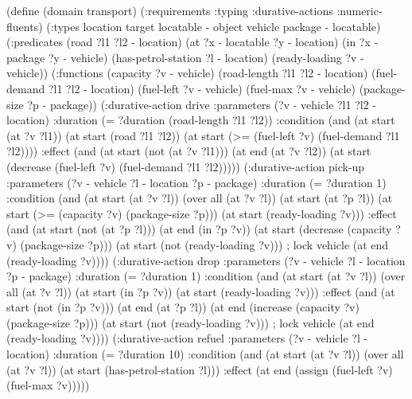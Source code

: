 \begin{pddl}
(define (domain transport) 
  (:requirements :typing :durative-actions :numeric-fluents)
  (:types
        location target locatable - object
        vehicle package - locatable)
  (:predicates (road ?l1 ?l2 - location)
     (at ?x - locatable ?y - location) (in ?x - package ?y - vehicle)
     (has-petrol-station ?l - location) (ready-loading ?v - vehicle))
  (:functions (capacity ?v - vehicle) (road-length ?l1 ?l2 - location)
     (fuel-demand ?l1 ?l2 - location) (fuel-left ?v - vehicle)
     (fuel-max ?v - vehicle) (package-size ?p - package))
  (:durative-action drive
    :parameters (?v - vehicle ?l1 ?l2 - location)
    :duration (= ?duration (road-length ?l1 ?l2))
    :condition (and (at start (at ?v ?l1))
        (at start (road ?l1 ?l2))
        (at start (>= (fuel-left ?v) (fuel-demand ?l1 ?l2))))
    :effect (and (at start (not (at ?v ?l1)))
        (at end (at ?v ?l2))
        (at start (decrease (fuel-left ?v) (fuel-demand ?l1 ?l2)))))
  (:durative-action pick-up
    :parameters (?v - vehicle ?l - location ?p - package)
    :duration (= ?duration 1)
    :condition (and (at start (at ?v ?l))
        (over all (at ?v ?l))        (at start (at ?p ?l))
        (at start (>= (capacity ?v) (package-size ?p)))
        (at start (ready-loading ?v)))
    :effect (and (at start (not (at ?p ?l))) (at end (in ?p ?v))
        (at start (decrease (capacity ?v) (package-size ?p)))
        (at start (not (ready-loading ?v))) ; lock vehicle
        (at end (ready-loading ?v))))
  (:durative-action drop
    :parameters (?v - vehicle ?l - location ?p - package)
    :duration (= ?duration 1)
    :condition (and (at start (at ?v ?l))
        (over all (at ?v ?l))        (at start (in ?p ?v))
        (at start (ready-loading ?v)))
    :effect (and (at start (not (in ?p ?v)))
        (at end (at ?p ?l))
        (at end (increase (capacity ?v) (package-size ?p)))
        (at start (not (ready-loading ?v))) ; lock vehicle
        (at end (ready-loading ?v))))
  (:durative-action refuel
    :parameters (?v - vehicle ?l - location)
    :duration (= ?duration 10)
    :condition (and (at start (at ?v ?l))
        (over all (at ?v ?l)) (at start (has-petrol-station ?l)))
    :effect (at end (assign (fuel-left ?v) (fuel-max ?v)))))
\end{pddl}

